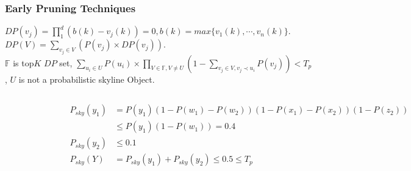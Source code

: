 \documentclass{beamer}
\begin{document}
\begin{frame}
\frametitle{Early Pruning Techniques}
\begin{lemma}
$DP(v_j)=\prod\limits_{1}^{d}(b(k)-v_j(k))=0, b(k) = max\{v_1(k),\cdots,v_n(k)\}$.\\
$DP(V) = \sum_{v_j\in V}(P(v_j)\times DP(v_j))$.\\
$\mathbb{F}$ is top$K$ $DP$ set, $\sum\limits_{u_i\in U} P(u_i)\times\prod\limits_{V\in\mathbb{F},V\neq U}(1-\sum\limits_{v_j\in V,v_j\prec u_i}P(v_j))<T_p$, $U$ is not a probabilistic skyline Object.\\
\end{lemma}

\begin{columns}[c] %
\begin{figure}[htpb]
  \begin{center}
	\includegraphics[width=\linewidth]{node.png}
  \end{center}
\end{figure}

\begin{example}
\tiny
\begin{align*}
P_{sky}(y_1)&=P(y_1)(1-P(w_1)-P(w_2))(1-P(x_1)-P(x_2))(1-P(z_2))\\
            &\leq P(y_1)(1-P(w_1))=0.4\\
P_{sky}(y_2)&\leq0.1\\
P_{sky}(Y)& = P_{sky}(y_1) + P_{sky}(y_2) \leq 0.5 \leq T_p\\
\end{align*}
\end{example}
\end{columns}
\end{frame}
\end{document}
